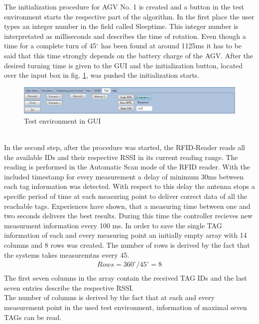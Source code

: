 The initialization procedure for AGV No. 1 is created and a button in the test environment starts the respective part of the algorithm. In the first place the user types an integer number in the field called Sleeptime. This integer number is interpretated as milliseconds and describes the time of rotation. Even though a time for a complete turn of 45$^\circ$  has been found at around 1125ms it has to be said that this time strongly depends on the battery charge of the AGV. After the desired turning time is given to the GUI and the initialization button, located over the input box in fig.  \ref{Screenshot_Test_environment}, was pushed the initialization starts.
\begin{figure}[!htbp]
\centering
\includegraphics[width = 16cm]{Pictures/Screenshot_Test_environment}
\caption{Test environment in GUI}
\label{Screenshot_Test_environment}
\end{figure}\\
In the second step, after the procedure was started, the RFID-Reader reads all the available IDs and their respective RSSI in its current reading range. The reading is performed in the Automatic Scan mode of the RFID reader\cite{KTSSysteme.2017}. With the included timestamp for every measurement a delay of minimum 30ms between each tag information was detected. With respect to this delay the antenna stops a specific period of time at each measuring point to deliver correct data of all the reachable tags. Experiences have shown, that a measuring time between one and two seconds delivers the best results. During this time the controller recieves new measurment information every 100 ms. In order to save the single TAG information of each and every measuring point an initially empty array with 14 columns and 8 rows was created. 
The number of rows is derived by the fact that the systems takes measuremtns every 45\textdegree. \\
\begin{align}
Rows = 360^\circ/45^\circ = 8\\
\end{align}
The first seven columns in the array contain the received TAG IDs and the last seven entries describe the respective RSSI. \\
The number of columns is derived by the fact that at each and every measurement point in the used test environment, information of maximal seven TAGs can be read. \\
